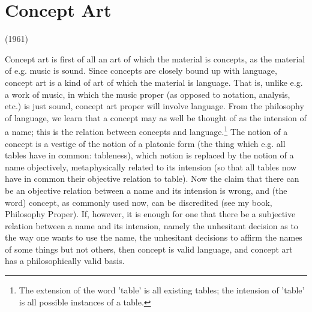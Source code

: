 \chapter{Concept Art}
{ \raggedleft (1961) \par }


Concept art is first of all an art of which the material is concepts, as the 
material of e.g. music is sound. Since concepts are closely bound up with 
language, concept art is a kind of art of which the material is language. That 
is, unlike e.g. a work of music, in which the music proper (as opposed to 
notation, analysis, etc.) is just sound, concept art proper will involve 
language. From the philosophy of language, we learn that a concept may as 
well be thought of as the intension of a name; this is the relation between 
concepts and language.\footnote{The extension of the word 'table' is all 
existing tables; the intension of 'table' is all possible instances of a table.}
The notion of a concept is a vestige of the notion of 
a platonic form (the thing which e.g. all tables have in common: tableness), 
which notion is replaced by the notion of a name objectively, metaphysically 
related to its intension (so that all tables now have in common their 
objective relation to table). Now the claim that there can be an objective 
relation between a name and its intension is wrong, and (the word) concept, 
as commonly used now, can be discredited (see my book, Philosophy 
Proper). If, however, it is enough for one that there be a subjective relation 
between a name and its intension, namely the unhesitant decision as to the 
way one wants to use the name, the unhesitant decisions to affirm the names 
of some things but not others, then concept is valid language, and concept 
art has a philosophically valid basis. 

